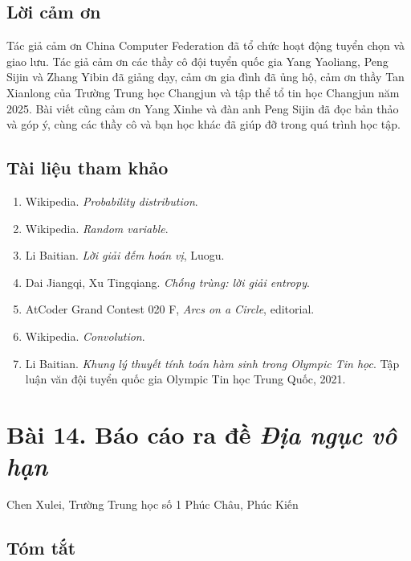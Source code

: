 \documentclass[11pt]{article}
\begin{document}
\subsection*{Lời cảm ơn}

Tác giả cảm ơn China Computer Federation đã tổ chức hoạt động tuyển chọn và
giao lưu. Tác giả cảm ơn các thầy cô đội tuyển quốc gia Yang Yaoliang, Peng
Sijin và Zhang Yibin đã giảng dạy, cảm ơn gia đình đã ủng hộ, cảm ơn thầy Tan
Xianlong của Trường Trung học Changjun và tập thể tổ tin học Changjun năm
2025. Bài viết cũng cảm ơn Yang Xinhe và đàn anh Peng Sijin đã đọc bản thảo và
góp ý, cùng các thầy cô và bạn học khác đã giúp đỡ trong quá trình học tập.

\subsection*{Tài liệu tham khảo}

\begin{enumerate}
  \item Wikipedia. \emph{Probability distribution}.
  \item Wikipedia. \emph{Random variable}.
  \item Li Baitian. \emph{Lời giải đếm hoán vị}, Luogu.
  \item Dai Jiangqi, Xu Tingqiang. \emph{Chống trùng: lời giải entropy}.
  \item AtCoder Grand Contest 020 F, \emph{Arcs on a Circle}, editorial.
  \item Wikipedia. \emph{Convolution}.
  \item Li Baitian. \emph{Khung lý thuyết tính toán hàm sinh trong Olympic Tin
  học}. Tập luận văn đội tuyển quốc gia Olympic Tin học Trung Quốc, 2021.
\end{enumerate}

\section*{Bài 14. Báo cáo ra đề \emph{Địa ngục vô hạn}}

\begin{center}
Chen Xulei, Trường Trung học số 1 Phúc Châu, Phúc Kiến
\end{center}

\subsection*{Tóm tắt}
\end{document}
